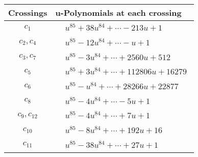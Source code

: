 \documentclass[1p]{elsarticle_modified}
\theoremstyle{definition}
\begin{document}
\begin{tabular}{m{50pt}|m{274pt}}
Crossings & \hspace{64pt}u-Polynomials at each crossing \\
\hline $$\begin{aligned}c_{1}\end{aligned}$$&$\begin{aligned}
&u^{85}+38 u^{84}+\cdots-213 u+1
\end{aligned}$\\
\hline $$\begin{aligned}c_{2},c_{4}\end{aligned}$$&$\begin{aligned}
&u^{85}-12 u^{84}+\cdots- u+1
\end{aligned}$\\
\hline $$\begin{aligned}c_{3},c_{7}\end{aligned}$$&$\begin{aligned}
&u^{85}-3 u^{84}+\cdots+2560 u+512
\end{aligned}$\\
\hline $$\begin{aligned}c_{5}\end{aligned}$$&$\begin{aligned}
&u^{85}+3 u^{84}+\cdots+112806 u+16279
\end{aligned}$\\
\hline $$\begin{aligned}c_{6}\end{aligned}$$&$\begin{aligned}
&u^{85}- u^{84}+\cdots+28266 u+22877
\end{aligned}$\\
\hline $$\begin{aligned}c_{8}\end{aligned}$$&$\begin{aligned}
&u^{85}-4 u^{84}+\cdots-5 u+1
\end{aligned}$\\
\hline $$\begin{aligned}c_{9},c_{12}\end{aligned}$$&$\begin{aligned}
&u^{85}-4 u^{84}+\cdots+7 u+1
\end{aligned}$\\
\hline $$\begin{aligned}c_{10}\end{aligned}$$&$\begin{aligned}
&u^{85}-8 u^{84}+\cdots+192 u+16
\end{aligned}$\\
\hline $$\begin{aligned}c_{11}\end{aligned}$$&$\begin{aligned}
&u^{85}-38 u^{84}+\cdots+27 u+1
\end{aligned}$\\
\hline
\end{tabular}\\~\\
\end{document}
